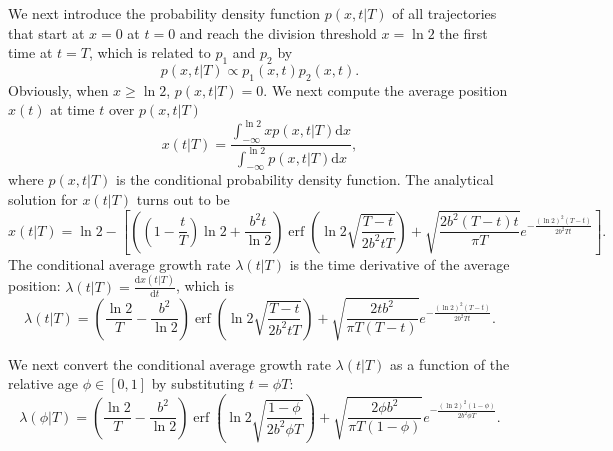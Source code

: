 \documentclass[aps, prl, longbibliography, linenumbers, superscriptaddress]{revtex4-2}
\begin{document}
We next introduce the probability density function $p(x, t|T)$ of all trajectories that start at $x=0$ at $t=0$ and reach the division threshold $x=\ln 2$ the first time at $t=T$, which is related to $p_1$ and $p_2$ by
\begin{equation}
	p(x, t|T) \propto p_1 (x, t) p_2 (x, t).
	\label{eq:conditional_density}
\end{equation}
Obviously, when $x \ge \ln 2$, $p(x, t|T) = 0$. We next compute the average position $x(t)$ at time $t$ over $p(x, t|T)$
\begin{equation}
	x(t|T) = \frac{\int_{-\infty}^{\ln 2} x p(x, t|T) \mathrm{d}x}{\int_{-\infty}^{\ln 2} p(x, t|T) \mathrm{d}x},
	\label{eq:x_avg_def}
\end{equation}
where $p(x, t|T)$ is the conditional probability density function. The analytical solution for $x(t|T)$ turns out to be
\begin{equation}
	x(t|T) = \ln 2 - \left[ \left( (1-\frac{t}{T})\ln 2 + \frac{b^2 t}{\ln 2} \right) \operatorname{erf}\left( \ln 2\sqrt{\frac{T-t}{2b^2 tT}} \right) + \sqrt{\frac{2b^2 (T-t)t}{\pi T}} e^{-\frac{(\ln 2)^2 (T-t)}{2b^2 Tt}} \right].
	\label{eq:x_avg_sol}
\end{equation}
The conditional average growth rate $\lambda(t|T)$ is the time derivative of the average position: $\lambda(t|T) = \frac{\mathrm{d}x(t|T)}{\mathrm{d}t}$, which is 
\begin{equation}
	\lambda(t|T) = \left( \frac{\ln 2}{T} - \frac{b^2}{\ln 2} \right) \operatorname{erf}\left( \ln 2\sqrt{\frac{T-t}{2b^2 tT}} \right) + \sqrt{\frac{2t b^2}{\pi T(T-t)}} e^{-\frac{(\ln 2)^2 (T-t)}{2b^2 Tt}}.
	\label{eq:x_prime_sol}
\end{equation}







We next convert the conditional average growth rate $\lambda(t|T)$ as a function of the relative age $\phi \in [0, 1]$ by substituting $t = \phi T$:
\begin{equation}
\lambda(\phi | T) = \left( \frac{\ln 2}{T} - \frac{b^2}{\ln 2} \right) \operatorname{erf}\left( \ln 2 \sqrt{\frac{1-\phi}{2b^2 \phi T}} \right) + \sqrt{\frac{2\phi b^2}{\pi T(1-\phi)}} e^{-\frac{(\ln 2)^2 (1-\phi)}{2b^2 \phi T}}.
\label{eq:conditional_rate}
\end{equation}
\end{document}
